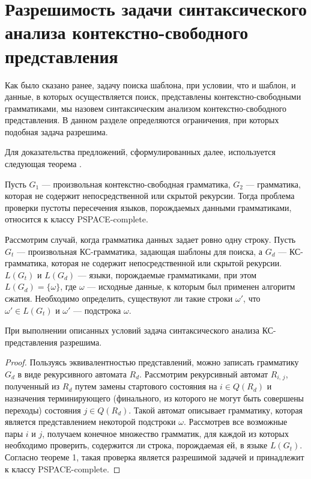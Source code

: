 \section{Разрешимость задачи синтаксического \\ анализа контекстно-свободного представления}
Как было сказано ранее, задачу поиска шаблона, при условии, что и шаблон, и данные, в которых осуществляется поиск, представлены контекстно-свободными грамматиками, мы назовем синтаксическим анализом контекстно-свободного представления. В данном разделе определяются ограничения, при которых подобная задача разрешима.

Для доказательства предложений, сформулированных далее, используется следующая теорема \cite{Nederhof}.

\begin{theorem}
	Пусть $G_1$ --- произвольная контекстно-свободная грамматика, $G_2$ --- грамматика, которая не содержит непосредственной или скрытой рекурсии. Тогда проблема проверки пустоты пересечения языков, порождаемых данными грамматиками, относится к классу PSPACE-complete.
\end{theorem}

Рассмотрим случай, когда грамматика данных задает ровно одну строку. Пусть $G_t$ --- произвольная КС-грамматика, задающая шаблоны для поиска, а $G_d$ --- КС-грамматика, которая не содержит непосредственной или скрытой рекурсии. $L(G_t)$ и $L(G_d)$ --- языки, порождаемые грамматиками, при этом $L(G_d) = \{\omega\}$, где $\omega$ --- исходные данные, к которым был применен алгоритм сжатия. 
Необходимо определить, существуют ли такие строки $\omega'$, что $\omega' \in L(G_t)$ и $\omega'$ --- подстрока $\omega$. 

\begin{prop}
	При выполнении описанных условий задача синтаксического анализа КС-представления разрешима.
\end{prop}

\begin{proof}
Пользуясь эквивалентностью представлений, можно записать грамматику $G_d$ в виде рекурсивного автомата $R_d$. Рассмотрим рекурсивный автомат $R_{i,\,j}$, полученный из $R_d$ путем замены стартового состояния на $i \in Q(R_d)$ и назначения терминирующего (финального, из которого не могут быть совершены переходы) состояния $j \in Q(R_d)$. Такой автомат описывает грамматику, которая является представлением некоторой подстроки $\omega$. 
Рассмотрев все возможные пары $i$ и $j$, получаем конечное множество грамматик, для каждой из которых необходимо проверить, содержится ли строка, порождаемая ей, в языке $L(G_t)$. 
Согласно теореме 1, такая проверка является разрешимой задачей и принадлежит к классу PSPACE-complete.
\end{proof}

